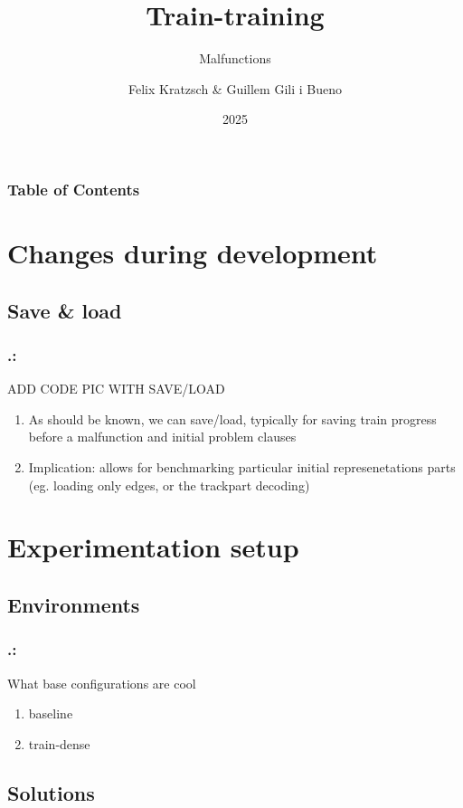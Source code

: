 \documentclass{beamer}
\title{Train-training}
\subtitle{Malfunctions}
\author{Felix  Kratzsch \& Guillem Gili i Bueno  }
\institute{Potsdam University - Railway Scheudling }
\date{2025}
\begin{document}
\frame{\titlepage}

\begin{frame}[label=toc]
\frametitle{Table of Contents}
\tableofcontents
\end{frame} 


\section{Changes during development}
\subsection{Save \& load}
\begin{frame}
	\frametitle{\thesection.\thesubsection   \secname : \subsecname}
	
	ADD CODE PIC WITH SAVE/LOAD
\begin{enumerate}
	\item{As should be known, we can save/load, typically for saving train progress before a malfunction and initial problem clauses} 
	\item{Implication: allows for benchmarking particular initial represenetations parts (eg. loading only edges, or the trackpart decoding)} 
\end{enumerate}
\end{frame}


\section{Experimentation setup}

\subsection{Environments}
\begin{frame}
	\frametitle{\thesection.\thesubsection   \secname : \subsecname}
	What base configurations are cool
	\begin{enumerate}
		\item{baseline} 
		\item{train-dense} 
	\end{enumerate}
	
\end{frame}

\subsection{Solutions}
\end{document}
